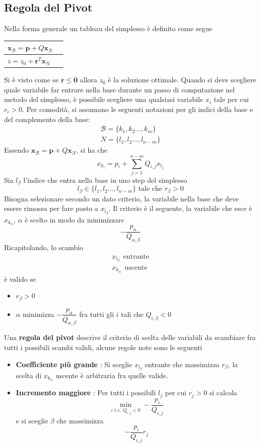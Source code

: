 \documentclass[10pt, letterpaper]{report}
\begin{document}
\subsection{Regola del Pivot}
Nella forma generale un tableau del simplesso è definito come segue 
\begin{center}
    \begin{tabular}{|l|l|}\hline 
       $\mathbf{x}_\mathcal{B} = \mathbf p + Q\mathbf x_N$\\ \hline 
       $z=z_0+\mathbf r^T\mathbf x_N$ \\\hline 
    \end{tabular}
\end{center}
Si è visto come se $\mathbf r \le \mathbf 0$ allora $z_0$ è la soluzione ottimale. Quando si deve scegliere quale variabile far entrare nella base durante un passo di computazione nel metodo del simplesso, è possibile scegliere una qualsiasi variabile $x_i$ tale per cui $r_i>0$. Per comodità, si assumano le seguenti notazioni per gli indici della base e del complemento della base:\begin{eqnarray*}
    \mathcal B = \{k_1,k_2\dots,k_m\}\\ 
    N=\{l_1,l_2\dots, l_{n-m}\}
\end{eqnarray*}
Essendo $\mathbf{x}_\mathcal{B} = \mathbf p + Q\mathbf x_N$, si ha che 
$$ x_{k_i}=p_i+\sum_{j=1}^{n-m}Q_{i,j}x_{l_j}$$
Sia $l_{\beta}$ l'indice che entra nella base in uno step del simplesso 
$$ l_\beta\in\{l_1,l_2\dots, l_{n-m}\} \text{ tale che }r_{\beta}>0$$
Bisogna selezionare secondo un dato criterio, la variabile nella base che deve essere rimossa per fare posto a $x_{l_\beta}$. Il criterio è il seguente, la variabile che esce è $x_{k_\alpha}$, $\alpha$ è scelto in modo da minimizzare 
$$-\frac{p_\alpha}{Q_{\alpha,\beta}} $$
Ricapitolando, lo scambio 
\begin{eqnarray*}
    x_{l_\beta} \ \  \text{entrante}\\
    x_{k_\alpha} \ \  \text{uscente}
\end{eqnarray*}
è valido se\begin{itemize}
    \item $r_\beta>0$\\ 
    \item $\alpha$ minimizza $-\dfrac{p_\alpha}{Q_{\alpha,\beta}}$ fra tutti gli $i$ tali che $Q_{i,\beta}<0$
\end{itemize}
Una \textbf{regola del pivot} descrive il criterio di scelta delle variabili da scambiare fra tutti i possibili scambi validi, alcune regole note sono le seguenti\begin{itemize}
    \item \textbf{Coefficiente più grande} : Si sceglie $x_{l_\beta}$ entrante che massimizza $r_\beta$, la scelta di $x_{k_\alpha}$ uscente è arbitraria fra quelle valide. 
    \item \textbf{Incremento maggiore} : Per tutti i possibili $l_j$ per cui $r_j>0$ si calcola 
    $$ \min_{i\text{ t.c. }Q_{i,j}<0}-\frac{p_i}{Q_{i,j}}$$
    e si sceglie $\beta$ che massimizza $$-\frac{p_i}{Q_{i,j}} r_j $$
\end{itemize}
\end{document}
